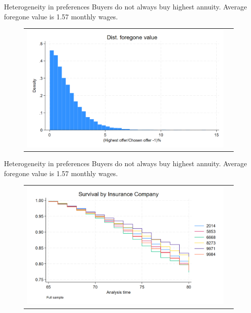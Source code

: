 \documentclass[10pt,aspectratio=169]{beamer}
\begin{document}
\begin{frame}{Heterogeneity in preferences}\label{slide:fig2}    
Buyers do not always buy highest annuity. Average foregone value is 1.57 monthly wages.
\begin{figure}[H]
\centering{}%
\begin{tabular}{cc}
\includegraphics[scale=0.25]{../figures/IE3_foregone_hist.png}
\end{tabular}
\end{figure}
\hyperlink{slide:answer1}{}
\end{frame}




\begin{frame}{Heterogeneity in preferences}\label{slide:fig3}    
Buyers do not always buy highest annuity. Average foregone value is 1.57 monthly wages.
\begin{figure}[H]
\centering{}%
\begin{tabular}{cc}
\includegraphics[scale=0.25]{../figures/IE6/IE6_survival_year_all.png}
\end{tabular}
\end{figure}
\hyperlink{slide:answer1}{}
\end{frame}
\end{document}
